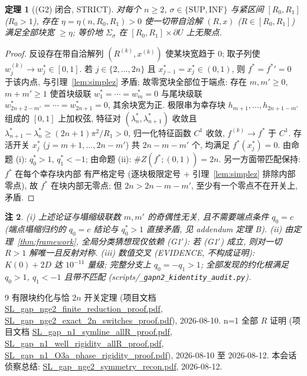 \documentclass[UTF8]{ctexart}
\newtheorem{theorem}{定理}[section]
\newtheorem{remark}[theorem]{注}
\begin{document}
\begin{theorem}[(G2) 闭合, STRICT]\label{thm:g2}
对每个 $n\ge2$, $\sigma\in\{\mathrm{SUP},\mathrm{INF}\}$ 与紧区间
$[R_0,R_1]$ ($R_0>1$), 存在 $\eta=\eta(n,R_0,R_1)>0$ 使一切带自洽解
$(R,x)$ ($R\in[R_0,R_1]$) 满足全部块宽 $\ge\eta$; 等价地 $\Sigma_\sigma$
在 $[R_0,R_1]\times\partial U$ 上无聚点.
\end{theorem}

\begin{proof}
反设存在带自洽解列 $(R^{(k)},x^{(k)})$ 使某块宽趋于 $0$; 取子列使
$w_j^{(k)}\to w_j^*\in[0,1]$. 若 $j\in\{2,\dots,2n\}$ 且
$x_{j-1}^*=x_j^*\in(0,1)$, 则 $f^*=f^{*}{}'=0$ 于该内点, 与引理~\ref{lem:simplez}
矛盾; 故零宽块全部位于端点: 存在 $m,m'\ge0$, $m+m'\ge1$ 使首块级联
$w_1^*=\cdots=w_m^*=0$ 与尾块级联 $w_{2n+2-m'}^*=\cdots=w_{2n+1}^*=0$,
其余块宽为正. 极限串为幸存块 $h_{m+1},\dots,h_{2n+1-m'}$ 组成的
$[0,1]$ 上加权弦, 特征对 $(\lambda_n^*,\lambda_{n+1}^*)$ 收敛且
$\lambda_{n+1}^*-\lambda_n^*\ge(2n+1)\pi^2/R_1>0$, 归一化特征函数 $C^1$ 收敛,
$f^{(k)}\to f^*$ 于 $C^1$. 存活开关 $x_j^*$ ($j=m+1,\dots,2n-m'$) 共
$2n-m-m'$ 个, 均满足 $f^*(x_j^*)=0$. 由命题 (i): $q_0^*>1$, $q_1^*<-1$;
由命题 (ii): $\#Z(f^*;(0,1))=2n$. 另一方面带匹配保持: $f^*$ 在每个幸存块内部
有严格定号 (逐块极限定号 + 引理~\ref{lem:simplez} 排除内部零点), 故
$f^*$ 在块内部无零点; 但 $2n>2n-m-m'$, 至少有一个零点不在开关上, 矛盾.
\end{proof}

\begin{remark}
(i) 上述论证与塌缩级联数 $m,m'$ 的奇偶性无关, 且不需要端点条件
$q_0=c$ (端点塌缩归约的 $q_0=c$ 结论与 $q_0^*>1$ 直接矛盾, 见 addendum
定理 B).  (ii) 由定理~\ref{thm:framework}, 全局分类猜想现仅依赖 (G1$'$):
若 (G1$'$) 成立, 则对一切 $R>1$ 解唯一且反射对称.  (iii) 数值交叉
(EVIDENCE, 不构成证明): $K(0)+2D$ 达 $10^{-11}$ 量级; 完整分支上
$q_0=-q_1>1$; 全部发现的约化根满足 $q_0>1$, $q_1<-1$ 且带不匹配
(scripts/\texttt{\_gapn2\_kidentity\_audit.py}).
\end{remark}
\begin{thebibliography}{9}
 有限块约化与恰 $2n$ 开关定理 (项目文档
\url{SL_gap_nge2_finite_reduction_proof.pdf}, \url{SL_gap_nge2_exact_2n_switches_proof.pdf}),
2026-08-10.
 n=1 全部 $R$ 证明 (项目文档
\url{SL_gap_n1_symline_allR_proof.pdf}, \url{SL_gap_n1_well_rigidity_allR_proof.pdf},
\url{SL_gap_n1_O3a_phase_rigidity_proof.pdf}), 2026-08-10 至 2026-08-12.
 本会话侦察总结: \url{SL_gap_nge2_symmetry_recon.pdf}, 2026-08-12.
\end{thebibliography}
\end{document}
